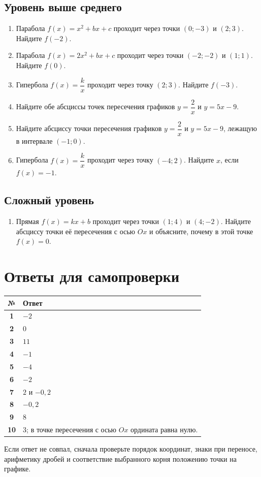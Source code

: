 \documentclass[a4paper,12pt]{article}
\begin{document}
\subsection*{Уровень выше среднего}
\begin{enumerate}[resume]
\item Парабола $f(x)=x^2+bx+c$ проходит через точки $(0;-3)$ и $(2;3)$. Найдите $f(-2)$.
\item Парабола $f(x)=2x^2+bx+c$ проходит через точки $(-2;-2)$ и $(1;1)$. Найдите $f(0)$.
\item Гипербола $f(x)=\dfrac{k}{x}$ проходит через точку $(2;3)$. Найдите $f(-3)$.
\item Найдите обе абсциссы точек пересечения графиков $y=\dfrac2x$ и $y=5x-9$.
\item Найдите абсциссу точки пересечения графиков $y=\dfrac2x$ и $y=5x-9$, лежащую в интервале $(-1;0)$.
\item Гипербола $f(x)=\dfrac{k}{x}$ проходит через точку $(-4;2)$. Найдите $x$, если $f(x)=-1$.
\end{enumerate}

\subsection*{Сложный уровень}
\begin{enumerate}[resume]
\item Прямая $f(x)=kx+b$ проходит через точки $(1;4)$ и $(4;-2)$. Найдите абсциссу точки её пересечения с осью $Ox$ и объясните, почему в этой точке $f(x)=0$.
\end{enumerate}

\clearpage
\section*{Ответы для самопроверки}
\begin{center}
\renewcommand{\arraystretch}{1.35}
\begin{tabularx}{0.88\textwidth}{>{\bfseries}c X}
\toprule
№ & Ответ \\
\midrule
1 & $-2$ \\
2 & $0$ \\
3 & $11$ \\
4 & $-1$ \\
5 & $-4$ \\
6 & $-2$ \\
7 & $2$ и $-0{,}2$ \\
8 & $-0{,}2$ \\
9 & $8$ \\
10 & $3$; в точке пересечения с осью $Ox$ ордината равна нулю. \\
\bottomrule
\end{tabularx}
\end{center}

\vfill
\begin{keybox}
Если ответ не совпал, сначала проверьте порядок координат, знаки при переносе, арифметику дробей и соответствие выбранного корня положению точки на графике.
\end{keybox}
\end{document}
